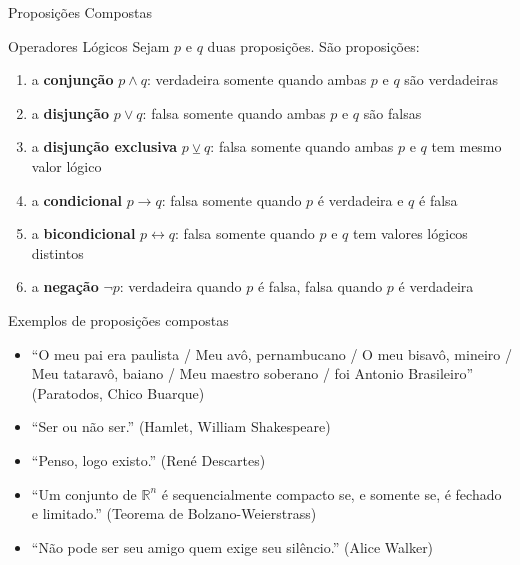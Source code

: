 \begin{frame}[fragile]{Proposições Compostas}

    \begin{block}{Operadores Lógicos}
        Sejam $p$ e $q$ duas proposições. São proposições:
        \begin{enumerate}
            \item a \textbf{conjunção} $p \land q$: verdadeira somente quando ambas $p$ e $q$ são verdadeiras
            \item a \textbf{disjunção} $p \lor q$: falsa somente quando ambas $p$ e $q$ são falsas
            \item a \textbf{disjunção exclusiva} $p \veebar q$: falsa somente quando ambas $p$ e $q$ tem mesmo valor lógico
            \item a \textbf{condicional} $p \to q$: falsa somente quando $p$ é verdadeira e $q$ é falsa
            \item a \textbf{bicondicional} $p \leftrightarrow q$: falsa somente quando $p$ e $q$ tem valores lógicos distintos
            \item a \textbf{negação} $\lnot p$: verdadeira quando $p$ é falsa, falsa quando $p$ é verdadeira
        \end{enumerate}
    \end{block}

\end{frame}

\begin{frame}[fragile]{Exemplos de proposições compostas}

    \begin{itemize}
        \item ``O meu pai era paulista / Meu avô, pernambucano / O meu bisavô, mineiro / Meu tataravô, baiano / Meu maestro soberano
            / foi Antonio Brasileiro'' (Paratodos, Chico Buarque)
        \item ``Ser ou não ser.'' (Hamlet, William Shakespeare)
        \item ``Penso, logo existo.'' (René Descartes)
        \item ``Um conjunto de $\mathbb{R}^{n}$ é sequencialmente compacto se, e somente se, é fechado e limitado.'' (Teorema de Bolzano-Weierstrass) 
        \item ``Não pode ser seu amigo quem exige seu silêncio.'' (Alice Walker)
    \end{itemize}

\end{frame}

